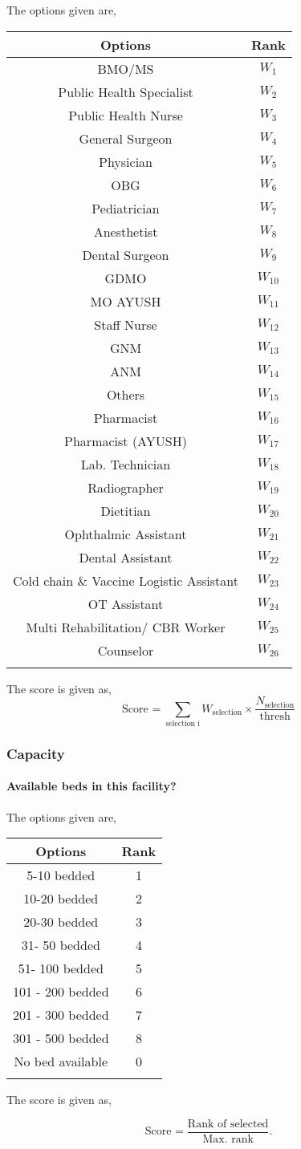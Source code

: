 \documentclass[oneside]{article}
\newcommand{\tsub}[2]{\text{#1}_{\text{#2}}}
\newcommand{\tsubb}[2]{#1_{\text{#2}}}
\newcommand{\dsub}[2]{\dfrac{\text{#1}}{\text{#2}}}
\newcommand{\singsel}[1]
{
	\[
		\tsub{Score}{#1} = \dsub{Rank of selected}{Max. rank}.
	\]
}
\newenvironment{ttable}
{
\begin{center}
\begin{tabular}{c|c}
\hline
}
{
\\ \hline
\end{tabular}
\end{center}
}
\begin{document}
The options given are,
\begin{ttable}
Options & Rank \\ \hline
BMO/MS & $W_1$ \\
Public Health Specialist & $W_2$ \\
Public Health Nurse & $W_3$ \\
General Surgeon & $W_4$ \\
Physician & $W_5$ \\
OBG & $W_6$ \\
Pediatrician & $W_7$ \\
Anesthetist & $W_8$ \\
Dental Surgeon & $W_9$ \\
	GDMO & $W_{10}$ \\
	MO AYUSH & $W_{11}$ \\
	Staff Nurse & $W_{12}$ \\
	GNM & $W_{13}$ \\
	ANM & $W_{14}$ \\
	Others & $W_{15}$ \\
	Pharmacist & $W_{16}$ \\
	Pharmacist (AYUSH) & $W_{17}$ \\
	Lab. Technician & $W_{18}$ \\
	Radiographer & $W_{19}$ \\
	Dietitian & $W_{20}$ \\
	Ophthalmic Assistant & $W_{21}$ \\
	Dental Assistant & $W_{22}$ \\
	Cold chain \& Vaccine Logistic Assistant & $W_{23}$ \\
	OT Assistant & $W_{24}$ \\
	Multi Rehabilitation/ CBR Worker & $W_{25}$ \\
	Counselor & $W_{26}$ \\
\hline
\end{ttable}
The score is given as,
\[
	\tsub{Score}{} = \sum_{\text{selection i}} \tsubb{W}{selection} \times \dfrac{\tsubb{N}{selection}}{\text{thresh}}
\]
\subsubsection{Capacity}

\paragraph{ Available beds in this facility?}

The options given are,
\begin{ttable}
Options & Rank \\ \hline
5-10 bedded & 1 \\
10-20 bedded & 2 \\
20-30 bedded & 3 \\
31- 50 bedded & 4 \\
51- 100 bedded & 5 \\
101 - 200 bedded & 6 \\
201 - 300 bedded & 7 \\
301 - 500 bedded & 8 \\
No bed available & 0 \\
\hline
\end{ttable}
The score is given as,
\singsel{}
\end{document}

